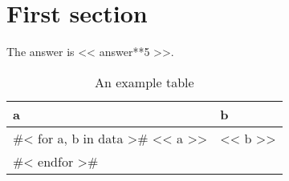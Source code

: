 \documentclass{article}
\begin{document}
\section{First section}

The answer is << answer**5 >>.

\begin{table}
\centering
\caption{An example table}
\begin{tabular}{l l}
\toprule
a & b \\
\midrule
#< for a, b in data >#
<< a >> & << b >> \\
#< endfor >#
\bottomrule
\end{tabular}
\end{table}
\end{document}
